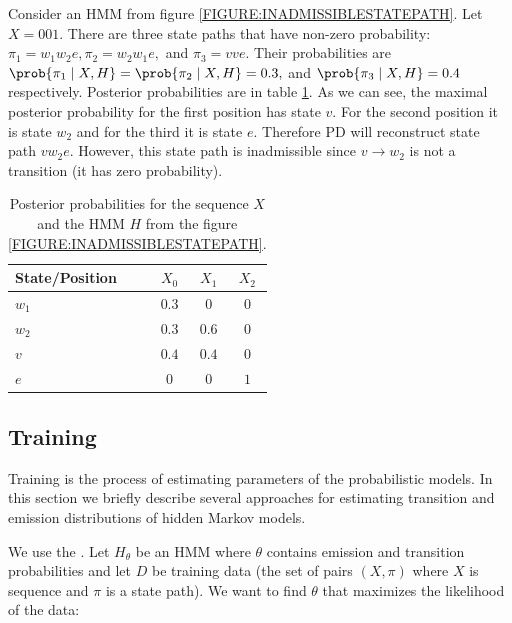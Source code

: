 \begin{example}
Consider an HMM from figure \ref{FIGURE:INADMISSIBLESTATEPATH}. Let $X=001$. There
are three state paths that have non-zero probability:
$\pi_1=w_1w_2e,\pi_2=w_2w_1e,$ and $\pi_3=vve$. Their probabilities are
$\prob{\pi_1\mid X,H}=\prob{\pi_2\mid X,H}=0.3,$ and $\prob{\pi_3\mid X,H}=0.4$
respectively.
Posterior probabilities are in table \ref{TABLE:INADMISSIBLESTATEPATH}.
As we can see, the maximal posterior probability for the first position has state
$v$. For the second position it is state $w_2$ and for the third it is state
$e$. Therefore PD will reconstruct state path $vw_2e$. However, this state path 
is inadmissible since  $v\to w_2$ is not a transition (it has zero probability).

\begin{table}
\begin{center}
\begin{tabular}{|l|c|c|c|}
\hline
State/Position & $X_0$ & $X_1$ & $X_2$ \\\hline
$w_1$ & $0.3$ & $0$ & $0$ \\\hline
$w_2$ & $0.3$ & $0.6$ & $0$ \\\hline
$v$   & $0.4$ & $0.4$ & $0$\\\hline
$e$  & $0$ & $0$ & $1$ \\\hline
\end{tabular}
\end{center}
\caption[Example of posterior probabilities.]{Posterior probabilities for
the sequence $X$ and the HMM $H$ from the figure \ref{FIGURE:INADMISSIBLESTATEPATH}.
}\label{TABLE:INADMISSIBLESTATEPATH}
\end{table}

\end{example}


\subsection{Training} 

Training is the process of estimating parameters of the probabilistic models. In this
section we briefly describe several approaches for estimating transition and
emission distributions of hidden Markov models.

We use the . Let $H_{\theta}$ be an HMM
where $\theta$ contains emission and transition probabilities and
let $D$ be training data (the set of pairs $(X,\pi)$ where $X$ is sequence and $\pi$ is a state path).  We
want to find $\theta$ that maximizes the likelihood of the data:

